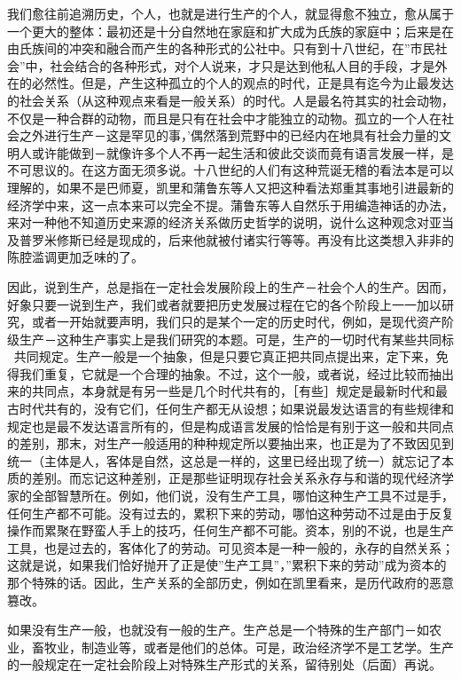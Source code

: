 \documentclass[a4paper,twoside,12pt]{ctexart}
\begin{document}
我们愈往前追溯历史，个人，也就是进行生产的个人，就显得愈不独立，愈从属于一个更大的整体：最初还是十分自然地在家庭和扩大成为氏族的家庭中；后来是在由氏族间的冲突和融合而产生的各种形式的公社中。只有到十八世纪，在”市民社会”中，社会结合的各种形式，对个人说来，才只是达到他私人目的手段，才是外在的必然性。但是，产生这种孤立的个人的观点的时代，正是具有迄今为止最发达的社会关系（从这种观点来看是一般关系）的时代。人是最名符其实的社会动物，不仅是一种合群的动物，而且是只有在社会中才能独立的动物。孤立的一个人在社会之外进行生产－这是罕见的事，’偶然落到荒野中的已经内在地具有社会力量的文明人或许能做到－就像许多个人不再一起生活和彼此交谈而竟有语言发展一样，是不可思议的。在这方面无须多说。十八世纪的人们有这种荒诞无稽的看法本是可以理解的，如果不是巴师夏，凯里和蒲鲁东等人又把这种看法郑重其事地引进最新的经济学中来，这一点本来可以完全不提。蒲鲁东等人自然乐于用编造神话的办法，来对一种他不知道历史来源的经济关系做历史哲学的说明，说什么这种观念对亚当及普罗米修斯已经是现成的，后来他就被付诸实行等等。再没有比这类想入非非的陈腔滥调更加乏味的了。

因此，说到生产，总是指在一定社会发展阶段上的生产－社会个人的生产。因而，好象只要一说到生产，我们或者就要把历史发展过程在它的各个阶段上一一加以研究，或者一开始就要声明，我们只的是某个一定的历史时代，例如，是现代资产阶级生产－这种生产事实上是我们研究的本题。可是，生产的一切时代有某些共同标，共同规定。生产一般是一个抽象，但是只要它真正把共同点提出来，定下来，免得我们重复，它就是一个合理的抽象。不过，这个一般，或者说，经过比较而抽出来的共同点，本身就是有另一些是几个时代共有的，［有些］规定是最新时代和最古时代共有的，没有它们，任何生产都无从设想；如果说最发达语言的有些规律和规定也是最不发达语言所有的，但是构成语言发展的恰恰是有别于这一般和共同点的差别，那末，对生产一般适用的种种规定所以要抽出来，也正是为了不致因见到统一（主体是人，客体是自然，这总是一样的，这里已经出现了统一）就忘记了本质的差别。而忘记这种差别，正是那些证明现存社会关系永存与和谐的现代经济学家的全部智慧所在。例如，他们说，没有生产工具，哪怕这种生产工具不过是手，任何生产都不可能。没有过去的，累积下来的劳动，哪怕这种劳动不过是由于反复操作而累聚在野蛮人手上的技巧，任何生产都不可能。资本，别的不说，也是生产工具，也是过去的，客体化了的劳动。可见资本是一种一般的，永存的自然关系；这就是说，如果我们恰好抛开了正是使”生产工具”，”累积下来的劳动”成为资本的那个特殊的话。因此，生产关系的全部历史，例如在凯里看来，是历代政府的恶意篡改。

如果没有生产一般，也就没有一般的生产。生产总是一个特殊的生产部门－如农业，畜牧业，制造业等，或者是他们的总体。可是，政治经济学不是工艺学。生产的一般规定在一定社会阶段上对特殊生产形式的关系，留待别处（后面）再说。
\end{document}
